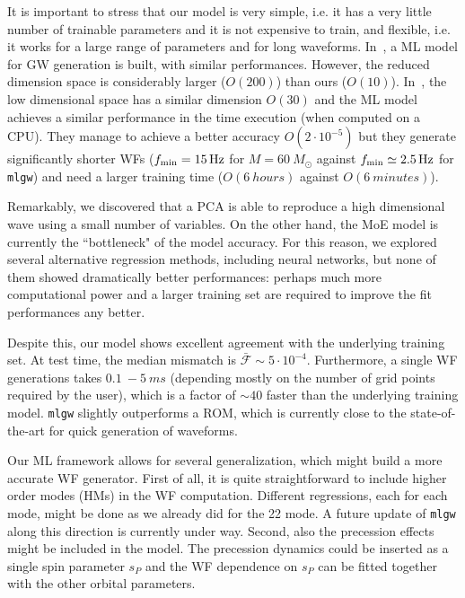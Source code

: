 It is important to stress that our model is very simple, i.e. it has a very little number of trainable parameters and 
it is not expensive to train, and flexible, i.e. it works for a large range of parameters and for long waveforms. In~\cite{Chua_2019}, 
a ML model for GW generation is built, with similar performances. However, the reduced dimension space is considerably 
larger ($O(200)$) than ours ($O(10)$).
In~\cite{Khan:2020fso}, the low dimensional space has a similar dimension $O(30)$ and the ML model achieves a similar performance in the time execution (when computed on a CPU). They manage to achieve a better accuracy $O(2\cdot10^{-5})$ but they generate significantly shorter WFs ($f_{\rm min} = \SI{15}{Hz}$ for $M = \SI{60}{M_{\odot}}$ against $f_{\rm min} \simeq \SI{2.5}{Hz}$ for \texttt{mlgw}) and need a larger training time ($O(\SI{6}{hours})$ against $O(\SI{6}{minutes})$).

Remarkably, we discovered that a PCA is able to reproduce a high dimensional wave using a small number of variables.
On the other hand, the MoE model is currently the ``bottleneck" of the model accuracy. For this reason, we explored 
several alternative regression methods, including neural networks, but none of them showed dramatically better 
performances: perhaps much more computational power and a larger training set are required to improve the 
fit performances any better.

Despite this, our model shows excellent agreement with the underlying training set. At test time, 
the median mismatch is $\bar{\mathcal{F}}\sim 5 \cdot 10^{-4}$.
Furthermore, a single WF generations takes $\SI{0.1}{}-\SI{5}{ms}$ (depending mostly on the 
number of grid points required by the user), which is a factor of $\sim 40$ faster than the underlying training model.
\texttt{mlgw} slightly outperforms a ROM, which is currently close to the state-of-the-art for quick generation
of waveforms.

Our ML framework allows for several generalization, which might build a more accurate WF generator.
First of all, it is quite straightforward to include higher order modes (HMs) in the WF computation. 
Different regressions, each for each mode, might be done as we already did for the 22 mode. 
A future update of \texttt{mlgw} along this direction is currently under way.
Second, also the precession effects might be included in the model.
The precession dynamics could be inserted as a single spin parameter $s_P$ \cite{Schmidt2015Precession} 
and the WF dependence on $s_P$ can be fitted together with the other orbital parameters.

